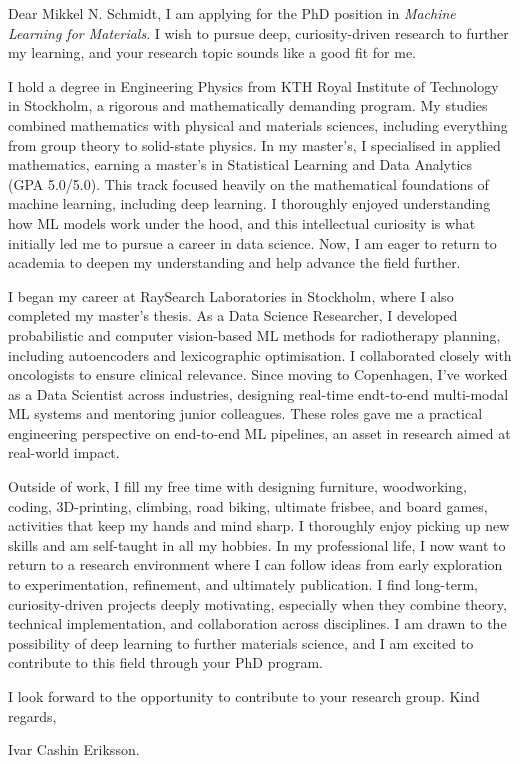 \documentclass[11pt,a4paper]{moderncv}
\begin{document}
\makecvtitle
Dear Mikkel N. Schmidt, I am applying for the PhD position in \textit{Machine Learning for Materials}. I wish to pursue deep, curiosity-driven research to further my learning, and your research topic sounds like a good fit for me.

\hspace*{2em}
I hold a degree in Engineering Physics from KTH Royal Institute of Technology in Stockholm, a rigorous and mathematically demanding program. My studies combined mathematics with physical and materials sciences, including everything from group theory to solid-state physics. In my master's, I specialised in applied mathematics, earning a master's in Statistical Learning and Data Analytics (GPA 5.0/5.0). This track focused heavily on the mathematical foundations of machine learning, including deep learning. I thoroughly enjoyed understanding how ML models work under the hood, and this intellectual curiosity is what initially led me to pursue a career in data science. Now, I am eager to return to academia to deepen my understanding and help advance the field further.

\hspace*{2em}
I began my career at RaySearch Laboratories in Stockholm, where I also completed my master's thesis. As a Data Science Researcher, I developed probabilistic and computer vision-based ML methods for radiotherapy planning, including autoencoders and lexicographic optimisation. I collaborated closely with oncologists to ensure clinical relevance. Since moving to Copenhagen, I've worked as a Data Scientist across industries, designing real-time endt-to-end multi-modal ML systems and mentoring junior colleagues. These roles gave me a practical engineering perspective on end-to-end ML pipelines, an asset in research aimed at real-world impact.

\hspace*{2em}
Outside of work, I fill my free time with designing furniture, woodworking, coding, 3D-printing, climbing, road biking, ultimate frisbee, and board games, activities that keep my hands and mind sharp. I thoroughly enjoy picking up new skills and am self-taught in all my hobbies. In my professional life, I now want to return to a research environment where I can follow ideas from early exploration to experimentation, refinement, and ultimately publication. I find long-term, curiosity-driven projects deeply motivating, especially when they combine theory, technical implementation, and collaboration across disciplines. I am drawn to the possibility of deep learning to further materials science, and I am excited to contribute to this field through your PhD program.

\vspace{8 mm}
I look forward to the opportunity to contribute to your research group. Kind regards,

\vspace{3 mm} 
Ivar Cashin Eriksson.
\end{document}
